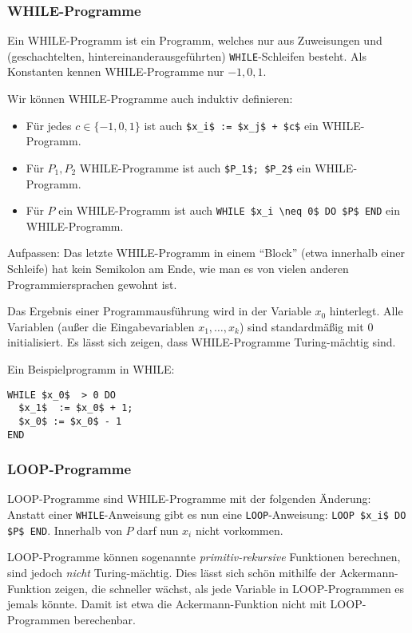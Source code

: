 \documentclass[a4paper,parskip=half*,DIV=7,fontsize=11pt]{scrartcl}
\begin{document}
\subsubsection{WHILE-Programme}
Ein  WHILE-Programm  ist ein Programm, welches nur aus Zuweisungen und  (geschachtelten, hintereinanderausgeführten) \lstinline{WHILE}-Schleifen besteht. Als Konstanten kennen WHILE-Programme nur $-1, 0, 1$. 

Wir können WHILE-Programme auch induktiv definieren:
\begin{itemize}
\item Für jedes $c \in \{-1, 0, 1\}$ ist auch \lstinline{$x_i$ := $x_j$ + $c$} ein WHILE-Programm.
\item Für $P_1, P_2$ WHILE-Programme ist auch \lstinline{$P_1$; $P_2$} ein WHILE-Programm.
\item Für $P$ ein WHILE-Programm ist auch \lstinline{WHILE $x_i \neq 0$ DO $P$ END} ein WHILE-Programm.
\end{itemize}

Aufpassen: Das letzte WHILE-Programm in einem ``Block'' (etwa innerhalb einer Schleife) hat kein Semikolon am Ende, wie man es von vielen anderen Programmiersprachen gewohnt ist.

Das Ergebnis einer Programmausführung wird in der Variable $x_0$ hinterlegt. Alle Variablen (außer die Eingabevariablen $x_1,\ldots,x_k$) sind standardmäßig mit $0$ initialisiert. Es lässt sich zeigen, dass  WHILE-Programme Turing-mächtig sind.

Ein Beispielprogramm in WHILE:

\begin{lstlisting}
WHILE $x_0$  > 0 DO
  $x_1$  := $x_0$ + 1;
  $x_0$ := $x_0$ - 1
END
\end{lstlisting}

\subsubsection{LOOP-Programme}
LOOP-Programme sind WHILE-Programme mit der folgenden Änderung: Anstatt einer \lstinline{WHILE}-Anweisung gibt es nun eine \lstinline{LOOP}-Anweisung: \lstinline{LOOP $x_i$ DO $P$ END}. Innerhalb von $P$ darf nun $x_i$ nicht vorkommen.

LOOP-Programme können sogenannte \textit{primitiv-rekursive} Funktionen berechnen, sind jedoch \emph{nicht} Turing-mächtig. Dies lässt sich schön mithilfe der Ackermann-Funktion zeigen, die schneller wächst, als jede Variable in LOOP-Programmen es jemals könnte. Damit ist etwa die Ackermann-Funktion nicht mit LOOP-Programmen berechenbar.
\end{document}

